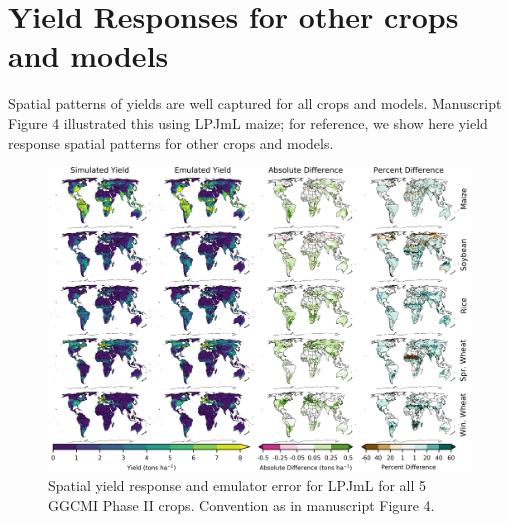 \documentclass[12pt]{article}
\begin{document}

\clearpage
\section{Yield Responses for other crops and models}
\begin{flushleft}
Spatial patterns of yields are well captured for all crops and models. Manuscript Figure 4 illustrated this using LPJmL maize; for reference, we show here yield response spatial patterns for other crops and models.  

\end{flushleft}

\begin{figure}[h!]
  \includegraphics[width=\textwidth]{lpjml_grid.png}
  \caption{Spatial yield response and emulator error for LPJmL for all 5 GGCMI Phase II crops. Convention as in manuscript Figure 4.}
  \label{fig:lpjmlrice}
\end{figure}
\end{document}
